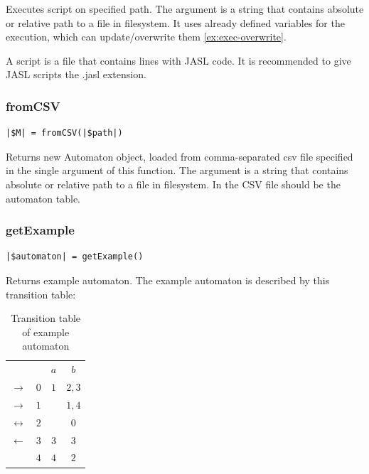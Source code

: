 \documentclass{ctuthesis}
\begin{document}
Executes script on specified path. The argument is a string that contains absolute or relative path to a file in filesystem. It uses already defined variables for the execution, which can update/overwrite them \ref{ex:exec-overwrite}.

A script is a file that contains lines with JASL code. It is recommended to give JASL scripts the .jasl extension.

\subsubsection{fromCSV}
\begin{lstlisting}[language = JASL_snippet]
	|$M| = fromCSV(|$path|)
\end{lstlisting}

Returns new Automaton object, loaded from comma-separated csv file specified in the single argument of this function. The argument is a string that contains absolute or relative path to a file in filesystem. In the CSV file should be the automaton table.

\subsubsection{getExample}
\begin{lstlisting}[language = JASL_snippet]
	|$automaton| = getExample()
\end{lstlisting}

Returns example automaton. The example automaton is described by this transition table:
\begin{table}[H]
\begin{ctucolortab}
\begin{tabular}{cc|c|c}
	 & & $a$ & $b$ \\\Midrule
	$\rightarrow$ & $0$ & $1$ & $2,3$ \\
	$\rightarrow$ & $1$ & & $1,4$ \\
	$\leftrightarrow$ & $2$ & & $0$ \\
	$\leftarrow$ & $3$ & $3$ & $3$ \\
	 & $4$ & $4$ & $2$ 
\end{tabular}
\end{ctucolortab}
\caption{Transition table of example automaton}
\label{fig:example_automaton_table}
\end{table}
\end{document}
